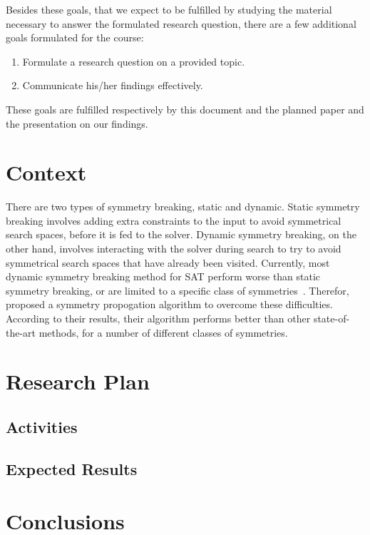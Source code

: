 			Besides these goals, that we expect to be fulfilled by studying the material necessary to answer the formulated research question, there are a few additional goals formulated for the course:

			\begin{enumerate}
				\item Formulate a research question on a provided topic.
				\item Communicate his/her findings effectively.
			\end{enumerate}

			These goals are fulfilled respectively by this document and the planned paper and the	presentation on our findings.

	\section{Context}
	There are two types of symmetry breaking, static and dynamic. Static symmetry breaking involves adding extra constraints to the input to avoid symmetrical search spaces, before it is fed to the solver. Dynamic symmetry breaking, on the other hand, involves interacting with the solver during search to try to avoid symmetrical search spaces that have already been visited.
	Currently, most dynamic symmetry breaking method for SAT perform worse than static symmetry breaking, or are limited to a specific class of symmetries~\cite{devriendt2012symmetry}. Therefor,~\cite{devriendt2012symmetry} proposed a symmetry propogation algorithm to overcome these difficulties. According to their results, their algorithm performs better than other state-of-the-art methods, for a number of different classes of symmetries.

	\section{Research Plan}

		\subsection{Activities}

		\subsection{Expected Results}

	\section{Conclusions}



